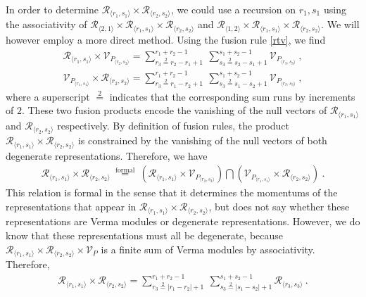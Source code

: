\documentclass[12pt, a4paper, notitlepage, twoside]{report}
\numberwithin{equation}{section}
\theoremstyle{break}
\begin{document}
In order to determine $\mathcal{R}_{\langle r_1,s_1 \rangle} \times \mathcal{R}_{\langle r_2,s_2 \rangle}$, we could use a recursion on $r_1,s_1$ using the associativity of $\mathcal{R}_{\langle 2,1\rangle}\times \mathcal{R}_{\langle r_1,s_1 \rangle} \times \mathcal{R}_{\langle r_2,s_2 \rangle}$ and $\mathcal{R}_{\langle 1,2\rangle}\times\mathcal{R}_{\langle r_1,s_1 \rangle} \times \mathcal{R}_{\langle r_2,s_2 \rangle}$. 
We will however employ a more direct method. 
Using the fusion rule \eqref{rtv}, we find 
\begin{align}
 \mathcal{R}_{\langle r_1,s_1 \rangle} \times \mathcal{V}_{P_{\langle r_2,s_2\rangle}} = \sum_{r_3\overset{2}{=}r_2-r_1+1}^{r_1+r_2-1}\ \sum_{s_3\overset{2}{=}s_2-s_1+1}^{s_1+s_2-1} \mathcal{V}_{P_{\langle r_3,s_3 \rangle}}\ ,
\\
\mathcal{V}_{P_{\langle r_1,s_1 \rangle}} \times \mathcal{R}_{\langle r_2,s_2\rangle} = \sum_{r_3\overset{2}{=}r_1-r_2+1}^{r_1+r_2-1}\ \sum_{s_3\overset{2}{=}s_1-s_2+1}^{s_1+s_2-1} \mathcal{V}_{P_{\langle r_3,s_3 \rangle}}\ ,
\end{align}
where a superscript $\overset{2}{=}$ indicates that the corresponding sum runs by increments of $2$.
These two fusion products encode the vanishing of the null vectors of $\mathcal{R}_{\langle r_1,s_1 \rangle}$ and $\mathcal{R}_{\langle r_2,s_2\rangle}$ respectively.
By definition of fusion rules, the product $\mathcal{R}_{\langle r_1,s_1 \rangle} \times \mathcal{R}_{\langle r_2,s_2 \rangle}$ is constrained by the vanishing of the null vectors of both degenerate representations. 
Therefore, we have 
\begin{align}
 \mathcal{R}_{\langle r_1,s_1 \rangle} \times \mathcal{R}_{\langle r_2,s_2 \rangle}\ \overset{\text{formal}}{=}\  \left(\mathcal{R}_{\langle r_1,s_1 \rangle} \times \mathcal{V}_{P_{\langle r_2,s_2\rangle}} \right) \bigcap \left(\mathcal{V}_{P_{\langle r_1,s_1 \rangle}} \times \mathcal{R}_{\langle r_2,s_2\rangle}\right)\ .
\end{align}
This relation is formal in the sense that it determines the momentums of the representations that appear in $\mathcal{R}_{\langle r_1,s_1 \rangle} \times \mathcal{R}_{\langle r_2,s_2 \rangle}$, but does not say whether these representations are Verma modules or degenerate representations. 
However, we do know that these representations must all be degenerate, because $\mathcal{R}_{\langle r_1,s_1 \rangle} \times \mathcal{R}_{\langle r_2,s_2 \rangle}\times \mathcal{V}_P$ is a finite sum of Verma modules by associativity.
Therefore,
\begin{align}
 \boxed{\mathcal{R}_{\langle r_1,s_1 \rangle} \times \mathcal{R}_{\langle r_2,s_2 \rangle} = \sum_{r_3\overset{2}{=}|r_1-r_2|+1}^{r_1+r_2-1}\ \sum_{s_3\overset{2}{=}|s_1-s_2|+1}^{s_1+s_2-1} \mathcal{R}_{\langle r_3,s_3 \rangle}}\ .
\label{rrsr}
\end{align}
\end{document}
